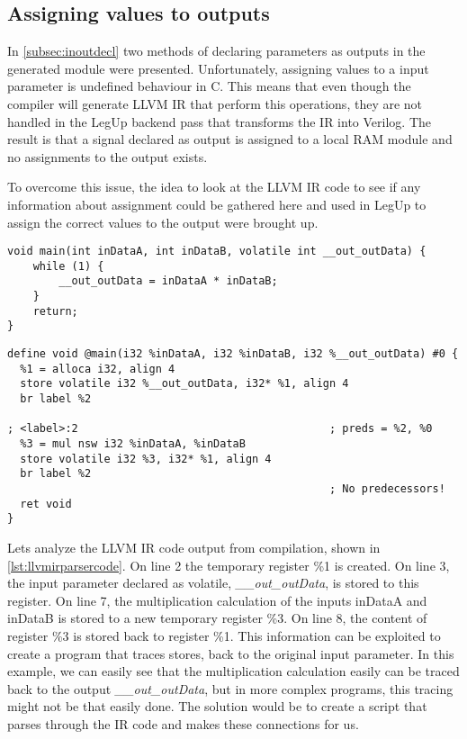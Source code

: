 \subsection{\label{sec:assValueToOutput}Assigning values to outputs}
In \cref{subsec:inoutdecl} two methods of declaring parameters as outputs in the generated module were presented. Unfortunately, assigning values to a input parameter is undefined behaviour in C. This means that even though the compiler will generate LLVM IR that perform this operations, they are not handled in the LegUp backend pass that transforms the IR into Verilog. The result is that a signal declared as output is assigned to a local RAM module and no assignments to the output exists.

To overcome this issue, the idea to look at the LLVM IR code to see if any information about assignment could be gathered here and used in LegUp to assign the correct values to the output were brought up. 
\lstset{language=C,style=Cstyle}
\begin{lstlisting}[caption={},label=lst:cllvmirparsercode]
void main(int inDataA, int inDataB, volatile int __out_outData) {
    while (1) {
        __out_outData = inDataA * inDataB;
    }
    return;
}
\end{lstlisting}
\lstset{language=LLVM,style=LLVMStyle}
\begin{lstlisting}[caption={},label=lst:llvmirparsercode]
define void @main(i32 %inDataA, i32 %inDataB, i32 %__out_outData) #0 {
  %1 = alloca i32, align 4
  store volatile i32 %__out_outData, i32* %1, align 4
  br label %2

; <label>:2                                       ; preds = %2, %0
  %3 = mul nsw i32 %inDataA, %inDataB
  store volatile i32 %3, i32* %1, align 4
  br label %2
                                                  ; No predecessors!
  ret void
}
\end{lstlisting}
Lets analyze the LLVM IR code output from compilation, shown in \cref{lst:llvmirparsercode}. On line 2 the temporary register \%1 is created. On line 3, the input parameter declared as volatile, \textit{\_\_out\_outData}, is stored to this register. On line 7, the multiplication calculation of the inputs inDataA and inDataB is stored to a new temporary register \%3. On line 8, the content of register \%3 is stored back to register \%1. This information can be exploited to create a program that traces stores, back to the original input parameter. In this example, we can easily see that the multiplication calculation easily can be traced back to the output \textit{\_\_out\_outData}, but in more complex programs, this tracing might not be that easily done. The solution would be to create a script that parses through the IR code and makes these connections for us. 

